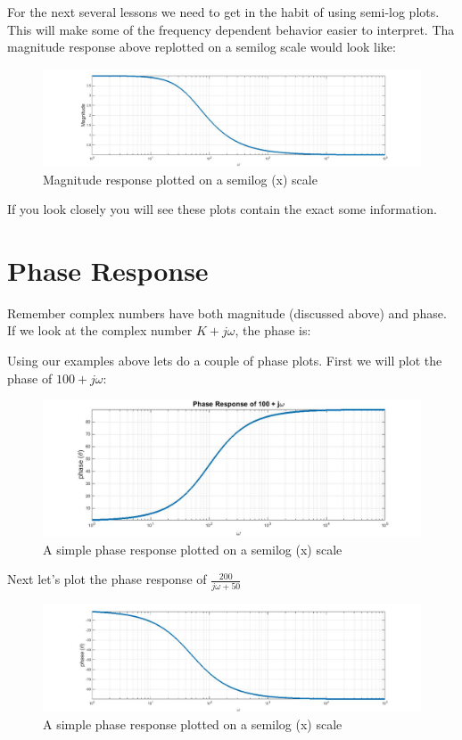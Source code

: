\documentclass{handout}
\begin{document}
For the next several lessons we need to get in the habit of using semi-log plots.  This will make some of the frequency dependent behavior easier to interpret.  Tha magnitude response above replotted on a semilog scale would look like:
\begin{figure} [h!]
\centering
\includegraphics[width=1\textwidth]{MagResponse3.jpg}
\caption{Magnitude response plotted on a semilog (x) scale}
\label{fig: MagResponse3}
\end{figure}

If you look closely you will see these plots contain the exact some information. 
\newpage
\clearpage
\pagebreak
\section{Phase Response}
Remember complex numbers have both magnitude (discussed above) and phase.  If we look at the complex number $K+j\omega$, the phase is:
\soln{1in}{
\[
\theta=\tan^{-1}\left(\frac{\omega}{K} \right)
\]
}

Using our examples above lets do a couple of phase plots.  First we will plot the phase of $100+j\omega$:
\begin{figure} [h!]
\centering
\includegraphics[width=1\textwidth]{PhaseResponse1.jpg}
\caption{A simple phase response plotted on a semilog (x) scale}
\label{fig: PhaseResponse1}
\end{figure}

Next let's plot the phase response of $\frac{200}{j\omega +50}$
\begin{figure} [h!]
\centering
\includegraphics[width=1\textwidth]{PhaseResponse2.jpg}
\caption{A simple phase response plotted on a semilog (x) scale}
\label{fig: PhaseResponse2}
\end{figure}
\newpage
\clearpage
\pagebreak
\end{document}
